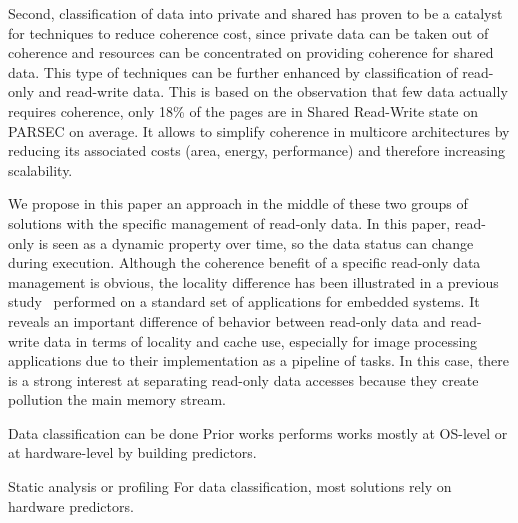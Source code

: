 \documentclass[sigconf]{acmart}
\begin{document}
Second, classification of data into private and shared has proven to be a catalyst for techniques to reduce coherence cost, since private data can be taken out of coherence and resources can be concentrated on providing coherence for shared data. This type of techniques can be further enhanced by classification of read-only and read-write data. This is based on the observation that few data actually requires coherence, only 18\% of the pages are in Shared Read-Write state on PARSEC on average\cite{Cuesta:2013}. It allows to simplify coherence in multicore architectures by reducing its associated costs (area, energy, performance) and therefore increasing scalability. 

We propose in this paper an approach in the middle of these two groups of solutions with the specific management of read-only data. In this paper, read-only is seen as a dynamic property over time, so the data status can change during execution. Although the coherence benefit of a specific read-only data management is obvious, the locality difference has been illustrated in a previous study~\cite{vaumourin:2014} performed on a standard set of applications for embedded systems. It reveals an important difference of behavior between read-only data and read-write data in terms of locality and cache use, especially for image processing applications due to their implementation as a pipeline of tasks. In this case, there is a strong interest at separating read-only data accesses because they create pollution the main memory stream.

Data classification can be done 
Prior works performs works mostly at OS-level or at hardware-level by building predictors. 

Static analysis or profiling      
For data classification, most solutions rely on hardware predictors. 


\end{document}
